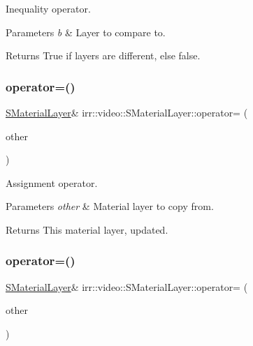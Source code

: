 Inequality operator. 


\begin{DoxyParams}{Parameters}
{\em b} & Layer to compare to. \\
\hline
\end{DoxyParams}
\begin{DoxyReturn}{Returns}
True if layers are different, else false. 
\end{DoxyReturn}
\mbox{\label{classirr_1_1video_1_1SMaterialLayer_a94f5f3af3cd4ded545779e1942c63734}} 
\subsubsection{\texorpdfstring{operator=()}{operator=()}\hspace{0.1cm}{\footnotesize\ttfamily [1/2]}}
{\footnotesize\ttfamily \hyperlink{classirr_1_1video_1_1SMaterialLayer}{S\+Material\+Layer}\& irr\+::video\+::\+S\+Material\+Layer\+::operator= (\begin{DoxyParamCaption}\item[{const \hyperlink{classirr_1_1video_1_1SMaterialLayer}{S\+Material\+Layer} \&}]{other }\end{DoxyParamCaption})\hspace{0.3cm}{\ttfamily [inline]}}



Assignment operator. 


\begin{DoxyParams}{Parameters}
{\em other} & Material layer to copy from. \\
\hline
\end{DoxyParams}
\begin{DoxyReturn}{Returns}
This material layer, updated. 
\end{DoxyReturn}
\mbox{\label{classirr_1_1video_1_1SMaterialLayer_a94f5f3af3cd4ded545779e1942c63734}} 
\subsubsection{\texorpdfstring{operator=()}{operator=()}\hspace{0.1cm}{\footnotesize\ttfamily [2/2]}}
{\footnotesize\ttfamily \hyperlink{classirr_1_1video_1_1SMaterialLayer}{S\+Material\+Layer}\& irr\+::video\+::\+S\+Material\+Layer\+::operator= (\begin{DoxyParamCaption}\item[{const \hyperlink{classirr_1_1video_1_1SMaterialLayer}{S\+Material\+Layer} \&}]{other }\end{DoxyParamCaption})\hspace{0.3cm}{\ttfamily [inline]}}



